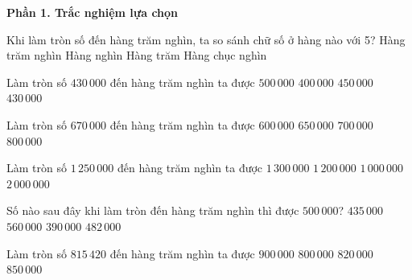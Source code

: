 \textbf{Phần 1. Trắc nghiệm lựa chọn}

\begin{ex} %
Khi làm tròn số đến hàng trăm nghìn, ta so sánh chữ số ở hàng nào với 5?
\choice
{Hàng trăm nghìn}
{Hàng nghìn}
{Hàng trăm}
{\True Hàng chục nghìn}
\end{ex}

\begin{ex} %
Làm tròn số $430\,000$ đến hàng trăm nghìn ta được
\choice
{$500\,000$}
{\True $400\,000$}
{$450\,000$}
{$430\,000$}
\end{ex}

\begin{ex} %
Làm tròn số $670\,000$ đến hàng trăm nghìn ta được
\choice
{$600\,000$}
{$650\,000$}
{\True $700\,000$}
{$800\,000$}
\end{ex}

\begin{ex} %
Làm tròn số $1\,250\,000$ đến hàng trăm nghìn ta được
\choice
{\True $1\,300\,000$}
{$1\,200\,000$}
{$1\,000\,000$}
{$2\,000\,000$}
\end{ex}

\begin{ex} %
Số nào sau đây khi làm tròn đến hàng trăm nghìn thì được $500\,000$?
\choice
{$435\,000$}
{$560\,000$}
{$390\,000$}
{\True $482\,000$}
\end{ex}

\begin{ex} %
Làm tròn số $815\,420$ đến hàng trăm nghìn ta được
\choice
{$900\,000$}
{\True $800\,000$}
{$820\,000$}
{$850\,000$}
\end{ex}

